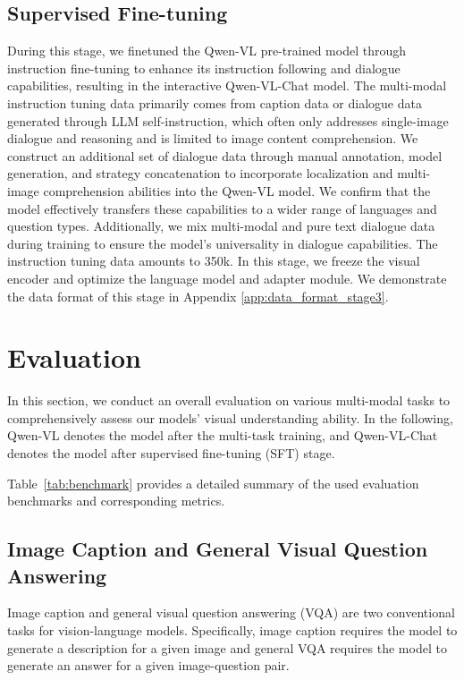 \documentclass{article}
\begin{document}
\subsection{Supervised Fine-tuning}
During this stage, we finetuned the Qwen-VL pre-trained model through instruction fine-tuning to enhance its instruction following and dialogue capabilities, resulting in the interactive Qwen-VL-Chat model. The multi-modal instruction tuning data primarily comes from caption data or dialogue data generated through LLM self-instruction, which often only addresses single-image dialogue and reasoning and is limited to image content comprehension. We construct an additional set of dialogue data through manual annotation, model generation, and strategy concatenation to incorporate localization and multi-image comprehension abilities into the Qwen-VL model. We confirm that the model effectively transfers these capabilities to a wider range of languages and question types. Additionally, we mix multi-modal and pure text dialogue data during training to ensure the model's universality in dialogue capabilities. The instruction tuning data amounts to 350k.
In this stage, we freeze the visual encoder and optimize the language model and adapter module. We demonstrate the data format of this stage in Appendix \ref{app:data_format_stage3}.




\section{Evaluation}

In this section, we conduct an overall evaluation on various multi-modal tasks to comprehensively assess our models' visual understanding ability.
In the following, Qwen-VL denotes the model after the multi-task training, and Qwen-VL-Chat denotes the model after supervised fine-tuning (SFT) stage.

Table~\ref{tab:benchmark} provides a detailed summary of the used evaluation benchmarks and corresponding metrics.


\subsection{Image Caption and General Visual Question Answering}

Image caption and general visual question answering (VQA) are two conventional tasks for vision-language models.
Specifically, image caption requires the model to generate a description for a given image and general VQA requires the model to generate an answer for a given image-question pair.
\end{document}
